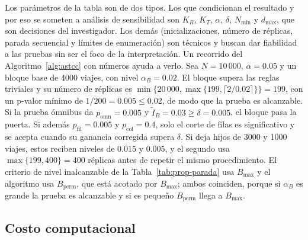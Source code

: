 Los parámetros de la tabla son de dos tipos. Los que condicionan el resultado y
por eso se someten a análisis de sensibilidad son $K_R$, $K_T$, $\alpha$, $\delta$,
$N_{\min}$ y $d_{\max}$, que son decisiones del investigador. Los demás
(inicializaciones, número de réplicas, parada secuencial y límites de enumeración)
son técnicos y buscan dar fiabilidad a las pruebas sin ser el foco de la
interpretación. Un recorrido del Algoritmo~\ref{alg:astcc} con números ayuda a
verlo. Sea $N=10\,000$, $\alpha=0.05$ y un bloque base de 4000 viajes, con nivel
$\alpha_B=0.02$. El bloque supera las reglas triviales y su número de réplicas es
$\min\{20\,000,\max\{199,\lceil 2/0.02\rceil\}\}=199$, con un p-valor mínimo de
$1/200=0.005\le 0.02$, de modo que la prueba es alcanzable. Si la prueba ómnibus da
$p_{\mathrm{omn}}=0.005$ y $\tilde I_B=0.03\ge\delta=0.005$, el bloque pasa la
puerta. Si además $p_{\mathrm{fil}}=0.005$ y $p_{\mathrm{col}}=0.4$, solo el corte de
filas es significativo y se acepta cuando su ganancia corregida supera $\delta$. Si
deja hijos de 3000 y 1000 viajes, estos reciben niveles de 0.015 y 0.005, y el segundo
usa $\max\{199,400\}=400$ réplicas antes de repetir el mismo procedimiento. El
criterio de nivel inalcanzable de la Tabla~\ref{tab:prop-parada} usa $B_{\max}$ y el
algoritmo usa $B_{\mathrm{perm}}$, que está acotado por $B_{\max}$; ambos coinciden,
porque si $\alpha_B$ es grande la prueba es alcanzable y si es pequeño
$B_{\mathrm{perm}}$ llega a $B_{\max}$.

\subsection{Costo computacional}

